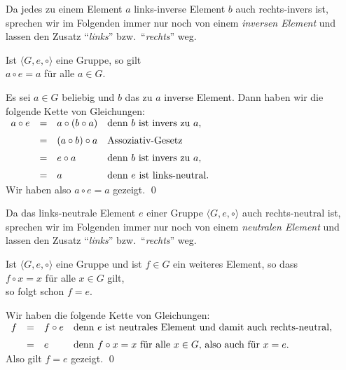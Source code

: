 \remark
Da jedes zu einem Element $a$ links-inverse Element $b$ auch rechts-invers ist, sprechen wir im Folgenden
immer nur noch von einem \emph{inversen Element} und lassen den Zusatz ``\emph{links}'' bzw.~``\emph{rechts}'' weg.
\eox

\begin{Satz} \lb
  Ist $\langle G, e, \circ \rangle$ eine Gruppe, so gilt
  \\[0.2cm]
  \hspace*{1.3cm}
  $a \circ e = a$ \quad f\"{u}r alle $a \in G$.
\end{Satz}

\proof
Es sei $a \in G$ beliebig und $b$ das zu $a$ inverse Element.  Dann haben wir die folgende Kette von
Gleichungen:
\\[0.2cm]
\hspace*{1.3cm}
$
\begin{array}[t]{lcll}
  a \circ e & = & a \circ (b \circ a) 
                & \mbox{denn $b$ ist invers zu $a$,} \\[0.2cm]
            & = & (a \circ b) \circ a
                & \mbox{Assoziativ-Gesetz} \\[0.2cm]
            & = & e \circ a
                & \mbox{denn $b$ ist invers zu $a$,} \\[0.2cm]
            & = & a 
                & \mbox{denn $e$ ist links-neutral.}
\end{array}
$
\\[0.2cm]
Wir haben also $a \circ e = a$ gezeigt. \qed

\remark
Da das links-neutrale Element $e$ einer Gruppe $\langle G, e, \circ \rangle$ auch rechts-neutral ist,
sprechen wir im Folgenden
immer nur noch von einem \emph{neutralen Element} und lassen den Zusatz ``\emph{links}'' bzw.~``\emph{rechts}'' weg.
\eox

\begin{Satz} \lb
  Ist $\langle G, e, \circ \rangle$ eine Gruppe und ist $f \in G$ ein weiteres  Element, so dass
  \\[0.2cm]
  \hspace*{1.3cm}
  $f \circ x = x$ \quad f\"{u}r alle $x \in G$ gilt,
  \\[0.2cm]
  so folgt schon $f = e$.
\end{Satz}

\proof
Wir haben die folgende Kette von Gleichungen:
\\[0.2cm]
\hspace*{1.3cm}
$
\begin{array}[t]{lcll}
  f & = & f \circ e & \mbox{denn $e$ ist neutrales Element und damit auch rechts-neutral,} \\[0.2cm]
    & = & e         & \mbox{denn $f \circ x = x$ f\"{u}r alle $x \in G$, also auch f\"{u}r $x = e$.} 
\end{array}
$
\\[0.2cm]
Also gilt $f = e$ gezeigt. \qed

